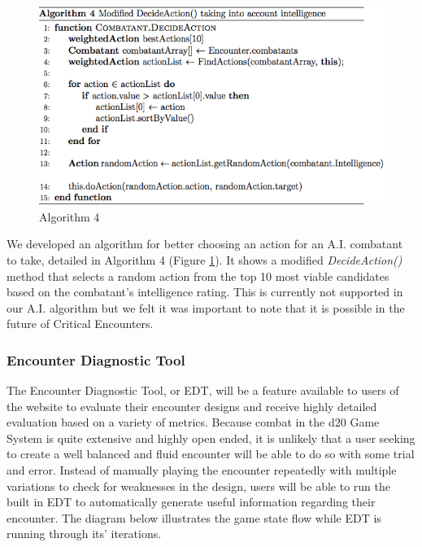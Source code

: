 \documentclass[letterpaper, 10 pt, conference]{ieeeconf}
\begin{document}
\begin{figure}[H]
	\centering
	\centerline{\includegraphics[scale=.37]{algorithm_4}}
	\caption{Algorithm 4}
	\label{fig: Algorithm 4}
\end{figure}

We developed an algorithm for better choosing an action for an A.I. combatant to take, detailed in Algorithm 4 (Figure \ref{fig: Algorithm 4}). It shows a modified\textit{ DecideAction()} method that selects a random
action from the top 10 most viable candidates based on the combatant’s intelligence
rating. This is currently not supported in our A.I. algorithm but we felt it was important to note that it is possible in the future of Critical Encounters.

\subsubsection{Encounter Diagnostic Tool}
The Encounter Diagnostic Tool, or EDT, will be a feature available to
users of the website to evaluate their encounter designs and receive highly detailed
evaluation based on a variety of metrics. Because combat in the d20 Game System
is quite extensive and highly open ended, it is unlikely that a user seeking to
create a well balanced and fluid encounter will be able to do so with some trial
and error. Instead of manually playing the encounter repeatedly with multiple
variations to check for weaknesses in the design, users will be able to run the
built in EDT to automatically generate useful information
regarding their encounter. The diagram below illustrates the game state flow while EDT is running through its' iterations.
\end{document}
